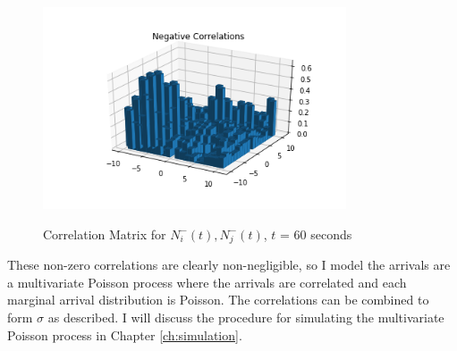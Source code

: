\begin{figure}[t]
\begin{center}
\label{fig:neg_neg_corr_pic}
\includegraphics[width=0.8\textwidth]{LaTeX/Figures/neg_neg_correlations.png}
\caption{Correlation Matrix for $N^{-}_i(t), N^{-}_j(t)$, $t$ = 60 seconds}
\end{center}
\end{figure}

These non-zero correlations are clearly non-negligible, so I model the arrivals are a multivariate Poisson process where the arrivals are correlated and each marginal arrival distribution is Poisson. The correlations can be combined to form $\sigma$ as described. I will discuss the procedure for simulating the multivariate Poisson process in Chapter \ref{ch:simulation}.
